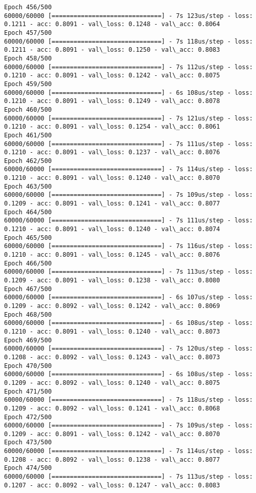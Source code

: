 \documentclass[11pt]{article}
\begin{document}
\begin{Verbatim}[commandchars=\\\{\}]
Epoch 456/500
60000/60000 [==============================] - 7s 123us/step - loss: 0.1211 - acc: 0.8091 - val\_loss: 0.1248 - val\_acc: 0.8064
Epoch 457/500
60000/60000 [==============================] - 7s 118us/step - loss: 0.1211 - acc: 0.8091 - val\_loss: 0.1250 - val\_acc: 0.8083
Epoch 458/500
60000/60000 [==============================] - 7s 112us/step - loss: 0.1210 - acc: 0.8091 - val\_loss: 0.1242 - val\_acc: 0.8075
Epoch 459/500
60000/60000 [==============================] - 6s 108us/step - loss: 0.1210 - acc: 0.8091 - val\_loss: 0.1249 - val\_acc: 0.8078
Epoch 460/500
60000/60000 [==============================] - 7s 121us/step - loss: 0.1210 - acc: 0.8091 - val\_loss: 0.1254 - val\_acc: 0.8061
Epoch 461/500
60000/60000 [==============================] - 7s 111us/step - loss: 0.1210 - acc: 0.8091 - val\_loss: 0.1237 - val\_acc: 0.8076
Epoch 462/500
60000/60000 [==============================] - 7s 114us/step - loss: 0.1210 - acc: 0.8091 - val\_loss: 0.1240 - val\_acc: 0.8070
Epoch 463/500
60000/60000 [==============================] - 7s 109us/step - loss: 0.1209 - acc: 0.8091 - val\_loss: 0.1241 - val\_acc: 0.8077
Epoch 464/500
60000/60000 [==============================] - 7s 111us/step - loss: 0.1210 - acc: 0.8091 - val\_loss: 0.1240 - val\_acc: 0.8074
Epoch 465/500
60000/60000 [==============================] - 7s 116us/step - loss: 0.1210 - acc: 0.8091 - val\_loss: 0.1245 - val\_acc: 0.8076
Epoch 466/500
60000/60000 [==============================] - 7s 113us/step - loss: 0.1209 - acc: 0.8091 - val\_loss: 0.1238 - val\_acc: 0.8080
Epoch 467/500
60000/60000 [==============================] - 6s 107us/step - loss: 0.1209 - acc: 0.8092 - val\_loss: 0.1242 - val\_acc: 0.8069
Epoch 468/500
60000/60000 [==============================] - 6s 108us/step - loss: 0.1210 - acc: 0.8091 - val\_loss: 0.1240 - val\_acc: 0.8073
Epoch 469/500
60000/60000 [==============================] - 7s 120us/step - loss: 0.1208 - acc: 0.8092 - val\_loss: 0.1243 - val\_acc: 0.8073
Epoch 470/500
60000/60000 [==============================] - 6s 108us/step - loss: 0.1209 - acc: 0.8092 - val\_loss: 0.1240 - val\_acc: 0.8075
Epoch 471/500
60000/60000 [==============================] - 7s 118us/step - loss: 0.1209 - acc: 0.8092 - val\_loss: 0.1241 - val\_acc: 0.8068
Epoch 472/500
60000/60000 [==============================] - 7s 109us/step - loss: 0.1209 - acc: 0.8091 - val\_loss: 0.1242 - val\_acc: 0.8070
Epoch 473/500
60000/60000 [==============================] - 7s 114us/step - loss: 0.1208 - acc: 0.8092 - val\_loss: 0.1238 - val\_acc: 0.8077
Epoch 474/500
60000/60000 [==============================] - 7s 113us/step - loss: 0.1207 - acc: 0.8092 - val\_loss: 0.1247 - val\_acc: 0.8083

\end{Verbatim}
\end{document}
